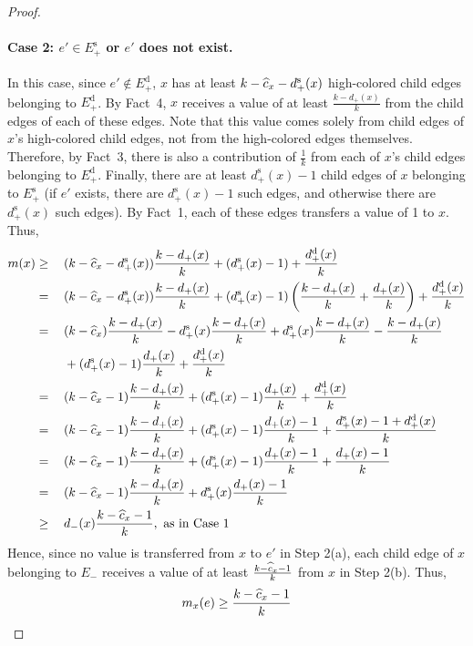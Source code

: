 \documentclass[smallextended]{svjour3}
\newcommand{\ed}{\ensuremath{E_{+}^{\text{d}}}\xspace}
\newcommand{\es}{\ensuremath{E_{+}^{\text{s}}}\xspace}
\def\dc{d_{+}}
\def\dd{d_{+}^{\text{d}}}
\def\dr{d_{-}}
\def\ds{d_{+}^{\text{s}}}
\begin{document}
\begin{proof}
\paragraph{Case 2: $e'\in\es$ or $e'$ does not exist.}
In this case, since $e' \not\in \ed$, $x$ has at least
 $k-\cmis-\ds(x)$ high-colored child edges belonging to $\ed$.
By Fact~4, $x$ receives a value of at least $\frac{k-\dc(x)}{k}$ from
 the child edges of each of these edges.
Note that this value comes solely from child edges of $x$'s
high-colored child edges, not from the high-colored edges
 themselves. 
Therefore, by Fact~3, there is also a contribution of
 $\frac1k$ from each of $x$'s child edges belonging to $\ed$.
Finally, there are at least $\ds(x)-1$ child edges of $x$ belonging to $\es$ (if $e'$ exists, there are $\ds(x)-1$ such edges, and otherwise there are $\ds(x)$ such edges). By Fact~1, each of these edges transfers a value of 1 to $x$. Thus, 
\begin{alignat*}{2}
m(x)
& \geq \: && (k-\cmis-\ds(x))\frac{k-\dc(x)}{k} + (\ds(x)-1) + \frac{\dd(x)}{k}\\
& = && (k-\cmis-\ds(x))\frac{k-\dc(x)}{k} +
       (\ds(x)-1) \left( \frac{k-\dc(x)}{k} + \frac{\dc(x)}{k} \right)
       + \frac{\dd(x)}{k} \\ 
& = && (k-\cmis) \frac{k-\dc(x)}{k} - \ds(x) \frac{k-\dc(x)}{k}
       + \ds(x)\frac{k-\dc(x)}{k} - \frac{k-\dc(x)}{k} \\
&   && + (\ds(x)-1)\frac{\dc(x)}{k} + \frac{\dd(x)}{k} \\
& = && (k-\cmis-1)\frac{k-\dc(x)}{k} + (\ds(x)-1)\frac{\dc(x)}{k}
       + \frac{\dd(x)}{k} \\ 
& = && (k-\cmis-1)\frac{k-\dc(x)}{k} + (\ds(x)-1)\frac{\dc(x)-1}{k} 
       + \frac{\ds(x)-1+\dd(x)}{k} \\ 
& = && (k-\cmis-1)\frac{k-\dc(x)}{k} + (\ds(x)-1)\frac{\dc(x)-1}{k} 
       + \frac{\dc(x)-1}{k} \\
& = && (k-\cmis-1)\frac{k-\dc(x)}{k} + \ds(x)\frac{\dc(x)-1}{k}\\
& \geq && \dr(x)\frac{k-\cmis-1}{k}, \text{ as in Case 1}
\end{alignat*}
Hence, since no value is transferred from $x$ to $e'$ in Step 2(a), each
 child edge of $x$ belonging to $E_-$ receives a value of at least $\frac{k-\widehat{c}_x-1}{k}$ from $x$ in Step 2(b).
Thus,
\begin{equation*}
m_x(e) \geq \frac{k-\widehat{c}_x-1}{k}
\end{equation*}


\end{proof}
\end{document}
